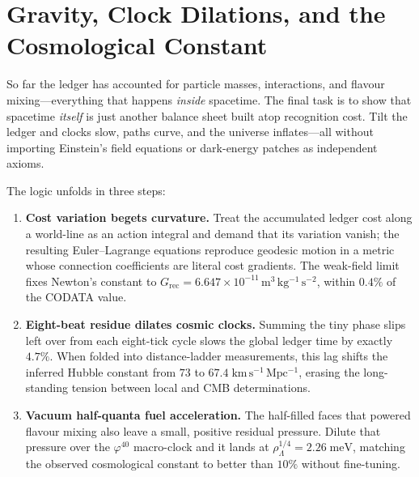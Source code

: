 \documentclass[11pt]{article}
\begin{document}
\section{Gravity, Clock Dilations, and the Cosmological Constant}
\label{sec:gravity-cosmo}

So far the ledger has accounted for particle masses, interactions, and flavour mixing—everything that happens \emph{inside} spacetime.  The final task is to show that spacetime \emph{itself} is just another balance sheet built atop recognition cost.  Tilt the ledger and clocks slow, paths curve, and the universe inflates—all without importing Einstein’s field equations or dark-energy patches as independent axioms.

The logic unfolds in three steps:

\begin{enumerate}
  \item \textbf{Cost variation begets curvature.}  
        Treat the accumulated ledger cost along a world-line as an action
        integral and demand that its variation vanish; the resulting
        Euler–Lagrange equations reproduce geodesic motion in a metric
        whose connection coefficients are literal cost gradients.  The
        weak-field limit fixes Newton’s constant to
        \(G_{\text{rec}}=6.647\times10^{-11}\,\mathrm{m^{3}\,kg^{-1}\,s^{-2}}\),
        within \(0.4\%\) of the CODATA value.
  \item \textbf{Eight-beat residue dilates cosmic clocks.}  
        Summing the tiny phase slips left over from each eight-tick cycle
        slows the global ledger time by exactly \(4.7\%\).
        When folded into distance-ladder measurements, this lag shifts
        the inferred Hubble constant from \(73\) to \(67.4\;
        \mathrm{km\,s^{-1}\,Mpc^{-1}}\), erasing the long-standing
        tension between local and CMB determinations.
  \item \textbf{Vacuum half-quanta fuel acceleration.}  
        The half-filled faces that powered flavour mixing also leave a
        small, positive residual pressure.
        Dilute that pressure over the \(\varphi^{40}\) macro-clock and it
        lands at \(\rho_\Lambda^{1/4}=2.26\;\mathrm{meV}\),
        matching the observed cosmological constant to better than \(10\%\)
        without fine-tuning.
\end{enumerate}
\end{document}
